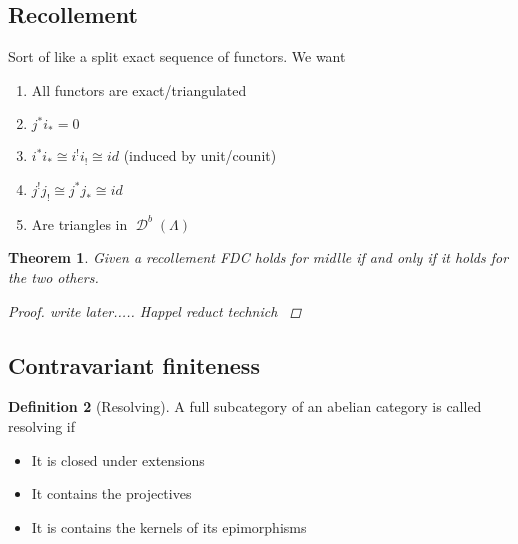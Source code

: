 \documentclass[11pt, a4paper, english]{article}
\newtheorem{theorem}{Theorem}[section]
\theoremstyle{definition}
\newtheorem{defn}[theorem]{Definition}
\DeclareMathOperator{\D}{\mathcal{D}}
\begin{document}
\subsection{Recollement}

Sort of like a split exact sequence of functors. We want
\begin{enumerate}
	\item All functors are exact/triangulated
	\item $j^*i_*=0$
	\item $i^*i_* \cong i^!i_! \cong id$ (induced by unit/counit)
	\item $j^!j_! \cong j^*j_* \cong id$
	\item 
	
	Are triangles in $\D^b(\Lambda)$
\end{enumerate}

\begin{theorem}
	Given a recollement FDC holds for midlle if and only if it holds for the two others.
	\begin{proof}
		write later..... Happel reduct technich \cite[3.3]{Hap93}
	\end{proof}
\end{theorem}

\subsection{Contravariant finiteness}

\begin{defn}[Resolving]
	A full subcategory of an abelian category is called resolving if 
	\begin{itemize}
		\item It is closed under extensions
		\item It contains the projectives
		\item It is contains the kernels of its epimorphisms
	\end{itemize}
\end{defn}
\end{document}

